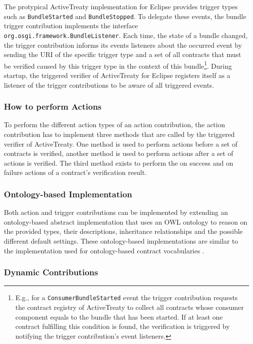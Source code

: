 \documentclass{llncs}
\begin{document}
The protypical ActiveTreaty implementation for Eclipse provides trigger types such as \texttt{BundleStarted} and \texttt{BundleStopped}. To delegate these events, the bundle trigger contribution implements the interface \texttt{org.osgi.framework.BundleListener}. Each time, the state of a bundle changed, the trigger contribution informs its events listeners about the occurred event by sending the URI of the specific trigger type and a set of all contracts that must be verified caused by this trigger type in the context of this bundle\footnote{E.g., for a \texttt{ConsumerBundleStarted} event the trigger contribution requests the contract registry of ActiveTreaty to collect all contracts whose consumer component equals to the bundle that has been started. If at least one contract fulfilling this condition is found, the verification is triggered by notifying the trigger contribution's event listeners.}. During startup, the triggered verifier of ActiveTreaty for Eclipse registers itself as a listener of the trigger contributions to be aware of all triggered events.

\subsubsection{How to perform Actions}

To perform the different action types of an action contribution, the action contribution has to implement three methods that are called by the triggered verifier of ActiveTreaty. One method is used to perform actions before a set of contracts is verified, another method is used to perform actions after a set of actions is verified. The third method exists to perform the on success and on failure actions of a contract's verification result.

\subsubsection{Ontology-based Implementation}

Both action and trigger contributions can be implemented by extending an ontology-based abstract implementation that uses an OWL ontology to reason on the provided types, their descriptions, inheritance relationships and the possible different default settings. These ontology-based implementations are similar to the implementation used for ontology-based contract vocabularies \cite{Treaty.JOT2009}.

\subsubsection{Dynamic Contributions}
\end{document}
